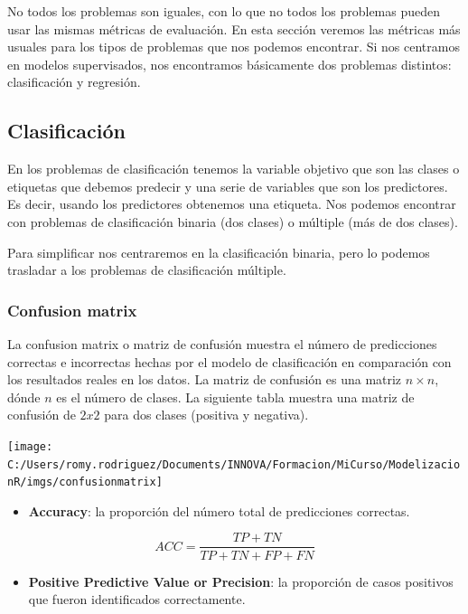 \documentclass[]{book}
\providecommand{\tightlist}{%
  \setlength{\itemsep}{0pt}\setlength{\parskip}{0pt}}
\begin{document}
No todos los problemas son iguales, con lo que no todos los problemas pueden usar las mismas métricas de evaluación. En esta sección veremos las métricas más usuales para los tipos de problemas que nos podemos encontrar. Si nos centramos en modelos supervisados, nos encontramos básicamente dos problemas distintos: clasificación y regresión.

\hypertarget{clasificacion}{%
\subsection{Clasificación}\label{clasificacion}}

En los problemas de clasificación tenemos la variable objetivo que son las clases o etiquetas que debemos predecir y una serie de variables que son los predictores. Es decir, usando los predictores obtenemos una etiqueta. Nos podemos encontrar con problemas de clasificación binaria (dos clases) o múltiple (más de dos clases).

Para simplificar nos centraremos en la clasificación binaria, pero lo podemos trasladar a los problemas de clasificación múltiple.

\hypertarget{confusion-matrix}{%
\subsubsection{Confusion matrix}\label{confusion-matrix}}

La confusion matrix o matriz de confusión muestra el número de predicciones correctas e incorrectas hechas por el modelo de clasificación en comparación con los resultados reales en los datos. La matriz de confusión es una matriz \(n \times n\), dónde \(n\) es el número de clases. La siguiente tabla muestra una matriz de confusión de \(2x2\) para dos clases (positiva y negativa).

\texttt{[image: C:/Users/romy.rodriguez/Documents/INNOVA/Formacion/MiCurso/ModelizacionR/imgs/confusionmatrix]}

\begin{itemize}
\tightlist
\item
  \textbf{Accuracy}: la proporción del número total de predicciones correctas.
\end{itemize}

\[ACC = \frac{TP+TN}{TP+TN+FP+FN}\]

\begin{itemize}
\tightlist
\item
  \textbf{Positive Predictive Value or Precision}: la proporción de casos positivos que fueron identificados correctamente.
\end{itemize}
\end{document}
